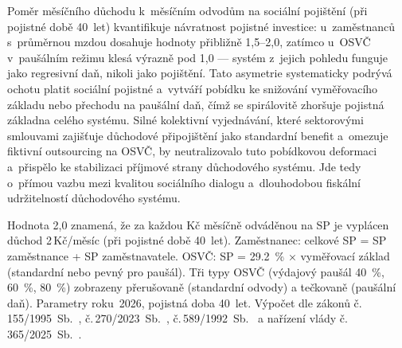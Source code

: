 Poměr měsíčního důchodu k~měsíčním odvodům na sociální pojištění (při pojistné době 40~let) kvantifikuje návratnost pojistné investice: u~zaměstnanců s~průměrnou mzdou dosahuje hodnoty přibližně 1,5--2,0, zatímco u~\ac{OSVČ} v~paušálním režimu klesá výrazně pod 1,0 --- systém z~jejich pohledu funguje jako regresivní daň, nikoli jako pojištění.
Tato asymetrie systematicky podrývá ochotu platit sociální pojistné a~vytváří pobídku ke snižování vyměřovacího základu nebo přechodu na paušální daň, čímž se spirálovitě zhoršuje pojistná základna celého systému.
Silné kolektivní vyjednávání, které sektorovými smlouvami zajišťuje důchodové připojištění jako standardní benefit a~omezuje fiktivní outsourcing na \ac{OSVČ}, by neutralizovalo tuto pobídkovou deformaci a~přispělo ke stabilizaci příjmové strany důchodového systému.
Jde tedy o~přímou vazbu mezi kvalitou sociálního dialogu a~dlouhodobou fiskální udržitelností důchodového systému.

 Hodnota 2,0 znamená, že za každou Kč měsíčně odváděnou na \ac{SP} je vyplácen důchod 2\,Kč/měsíc (při pojistné době 40~let). Zaměstnanec: celkové \ac{SP} = \ac{SP} zaměstnance + \ac{SP} zaměstnavatele. \ac{OSVČ}: \ac{SP} = \SI{29.2}{\percent} × vyměřovací základ (standardní nebo pevný pro paušál). Tři typy \ac{OSVČ} (výdajový paušál \SI{40}{\percent}, \SI{60}{\percent}, \SI{80}{\percent}) zobrazeny přerušovaně (standardní odvody) a tečkovaně (paušální daň). Parametry roku~2026, pojistná doba 40~let. Výpočet dle zákonů č.\,155/1995~Sb.~\cite{zakon_zpds_1995}, č.\,270/2023~Sb.~\cite{zakon_duchreforma_2023}, č.\,589/1992~Sb.~\cite{zakon_sp_1992} a nařízení vlády č.\,365/2025~Sb.~\cite{nv_365_2025}.
